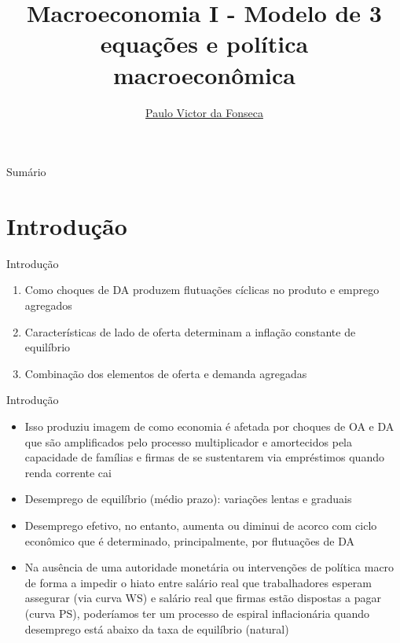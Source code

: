 \documentclass[10pt]{beamer}
\title[]{Macroeconomia I - Modelo de 3 equações e política macroeconômica}
\author[]{\href{https://pvfonseca.github.io}{Paulo Victor da Fonseca}}
\date{}
\begin{document}
\begin{frame}[plain]
\end{frame}

\begin{frame}{Sumário}
    \tableofcontents
\end{frame}

\section{Introdução}
\begin{frame}
    {Introdução}
    \begin{enumerate}
        \item Como choques de DA produzem flutuações cíclicas no produto e emprego agregados\bigskip
        \item Características de lado de oferta determinam a inflação constante de equilíbrio\bigskip
        \item Combinação dos elementos de oferta e demanda agregadas
    \end{enumerate}
\end{frame}

\begin{frame}
    {Introdução}
    \begin{itemize}
        \item Isso produziu imagem de como economia é afetada por choques de OA e DA que são amplificados pelo processo multiplicador e amortecidos pela capacidade de famílias e firmas de se sustentarem via empréstimos quando renda corrente cai\bigskip
        \item Desemprego de equilíbrio (médio prazo): variações lentas e graduais\bigskip
        \item Desemprego efetivo, no entanto, aumenta ou diminui de acorco com ciclo econômico que é determinado, principalmente, por flutuações de DA\bigskip
        \item Na ausência de uma autoridade monetária ou intervenções de política macro de forma a impedir o hiato entre salário real que trabalhadores esperam assegurar (via curva WS) e salário real que firmas estão dispostas a pagar (curva PS), poderíamos ter um processo de espiral inflacionária quando desemprego está abaixo da taxa de equilíbrio (natural)
    \end{itemize}
\end{frame}
\end{document}
